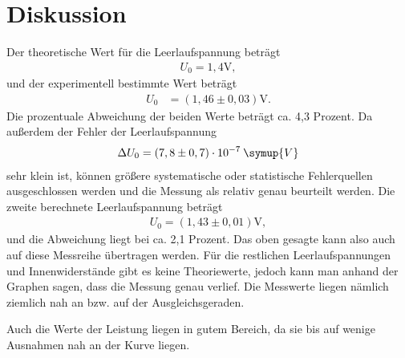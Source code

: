 \section{Diskussion}
\label{sec:Diskussion}

Der theoretische Wert für die Leerlaufspannung beträgt
\begin{align*}
U_0 = 1,4 \si{\volt} ,
\end{align*}
\noindent und der experimentell bestimmte Wert beträgt
\begin{align*}
U_0 &= (1,46 \pm 0,03)\si{\volt} .
\end{align*}
Die prozentuale Abweichung der beiden Werte beträgt ca. 4,3 Prozent.
Da außerdem der Fehler der Leerlaufspannung
\begin{align*}
\Delta U_0 = (7,8 \pm 0,7) \cdot 10^{-7} \: \symup{V} 
\end{align*}
sehr klein ist, können größere systematische oder statistische Fehlerquellen ausgeschlossen werden und die Messung als relativ genau beurteilt werden.
Die zweite berechnete Leerlaufspannung beträgt
\begin{align*}
U_0 =  (1,43 \pm 0,01)\si{\volt} ,
\end{align*}
und die Abweichung liegt bei ca. 2,1 Prozent. Das oben gesagte kann also auch auf diese Messreihe übertragen werden.
Für die restlichen Leerlaufspannungen und Innenwiderstände gibt es keine Theoriewerte, jedoch kann man anhand der Graphen sagen,
dass die Messung genau verlief. Die Messwerte liegen nämlich ziemlich nah an bzw. auf der Ausgleichsgeraden.

\noindent Auch die Werte der Leistung liegen in gutem Bereich, da sie bis auf wenige Ausnahmen nah an der Kurve liegen. 





